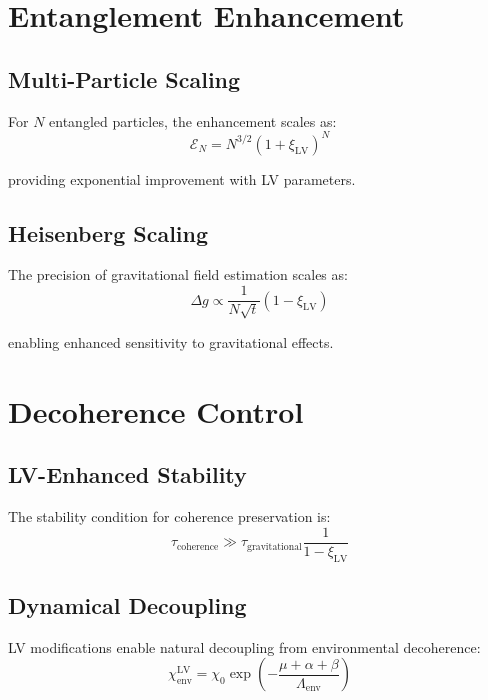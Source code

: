 \documentclass[11pt]{article}
\begin{document}
\section{Entanglement Enhancement}

\subsection{Multi-Particle Scaling}

For $N$ entangled particles, the enhancement scales as:
\begin{equation}
\mathcal{E}_N = N^{3/2} \left(1 + \xi_{\text{LV}}\right)^N
\end{equation}

providing exponential improvement with LV parameters.

\subsection{Heisenberg Scaling}

The precision of gravitational field estimation scales as:
\begin{equation}
\Delta g \propto \frac{1}{N\sqrt{t}} \left(1 - \xi_{\text{LV}}\right)
\end{equation}

enabling enhanced sensitivity to gravitational effects.

\section{Decoherence Control}

\subsection{LV-Enhanced Stability}

The stability condition for coherence preservation is:
\begin{equation}
\tau_{\text{coherence}} \gg \tau_{\text{gravitational}} \frac{1}{1 - \xi_{\text{LV}}}
\end{equation}

\subsection{Dynamical Decoupling}

LV modifications enable natural decoupling from environmental decoherence:
\begin{equation}
\chi_{\text{env}}^{\text{LV}} = \chi_0 \exp\left(-\frac{\mu + \alpha + \beta}{\Lambda_{\text{env}}}\right)
\end{equation}
\end{document}
